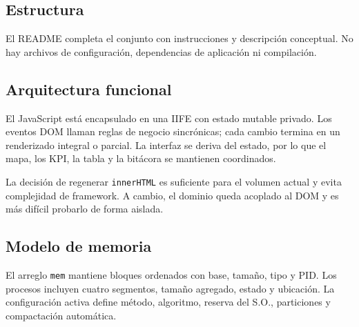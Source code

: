 \documentclass[11pt,a4paper]{article}
\newcommand{\archivo}[1]{\texttt{#1}}
\begin{document}
\subsection{Estructura}

\begin{center}
\end{center}

El README completa el conjunto con instrucciones y descripción conceptual. No hay
archivos de configuración, dependencias de aplicación ni compilación.

\subsection{Arquitectura funcional}

El JavaScript está encapsulado en una IIFE con estado mutable privado. Los eventos
DOM llaman reglas de negocio sincrónicas; cada cambio termina en un renderizado
integral o parcial. La interfaz se deriva del estado, por lo que el mapa, los KPI,
la tabla y la bitácora se mantienen coordinados.

La decisión de regenerar \texttt{innerHTML} es suficiente para el volumen actual y
evita complejidad de framework. A cambio, el dominio queda acoplado al DOM y es más
difícil probarlo de forma aislada.

\subsection{Modelo de memoria}

El arreglo \texttt{mem} mantiene bloques ordenados con base, tamaño, tipo y PID.
Los procesos incluyen cuatro segmentos, tamaño agregado, estado y ubicación. La
configuración activa define método, algoritmo, reserva del S.O., particiones y
compactación automática.
\end{document}
